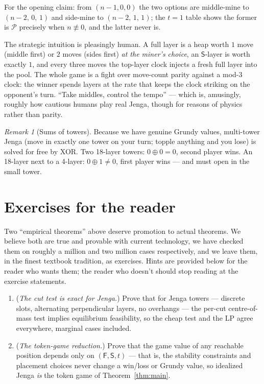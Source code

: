 \documentclass[11pt]{article}
\theoremstyle{definition}
\theoremstyle{remark}
\newtheorem{remark}[theorem]{Remark}
\newcommand{\Fq}{\mathsf{F}}
\newcommand{\Sq}{\mathsf{S}}
\begin{document}
For the opening claim: from $(n{-}1, 0, 0)$ the two options are
middle-mine to $(n{-}2,\,0,\,1)$ and side-mine to $(n{-}2,\,1,\,1)$; the
$t=1$ table shows the former is $\mathcal{P}$ precisely when
$n \not\equiv 0$, and the latter never is.

The strategic intuition is pleasingly human. A full layer is a heap worth
$1$ move (middle first) or $2$ moves (sides first) \emph{at the miner's
choice}, an $\Sq$-layer is worth exactly $1$, and every three moves the
top-layer clock injects a fresh full layer into the pool. The whole game is
a fight over move-count parity against a mod-$3$ clock: the winner spends
layers at the rate that keeps the clock striking on the opponent's turn.
``Take middles, control the tempo'' --- which is, amusingly, roughly how
cautious humans play real Jenga, though for reasons of physics rather than
parity.

\begin{remark}[Sums of towers]\label{rem:sums}
Because we have genuine Grundy values, multi-tower Jenga (move in exactly
one tower on your turn; topple anything and you lose) is solved for free by
XOR. Two 18-layer towers: $0 \oplus 0 = 0$, second player wins. An
18-layer next to a 4-layer: $0 \oplus 1 \ne 0$, first player wins --- and
must open in the small tower.
\end{remark}

\section{Exercises for the reader}

Two ``empirical theorems'' above deserve promotion to actual theorems. We
believe both are true and provable with current technology, we have checked
them on roughly a million and two million cases respectively, and we leave
them, in the finest textbook tradition, as exercises. Hints are provided
below for the reader who wants them; the reader who doesn't should stop
reading at the exercise statements.

\begin{enumerate}
\item[\textbf{Ex.\ 1.}] (\emph{The cut test is exact for Jenga.}) Prove
that for Jenga towers --- discrete slots, alternating perpendicular layers,
no overhangs --- the per-cut centre-of-mass test implies equilibrium
feasibility, so the cheap test and the LP agree everywhere, marginal cases
included.

\item[\textbf{Ex.\ 2.}] (\emph{The token-game reduction.}) Prove that the
game value of any reachable position depends only on $(\Fq, \Sq, t)$ ---
that is, the stability constraints and placement choices never change a
win/loss or Grundy value, so idealized Jenga \emph{is} the token game of
Theorem~\ref{thm:main}.
\end{enumerate}
\end{document}
